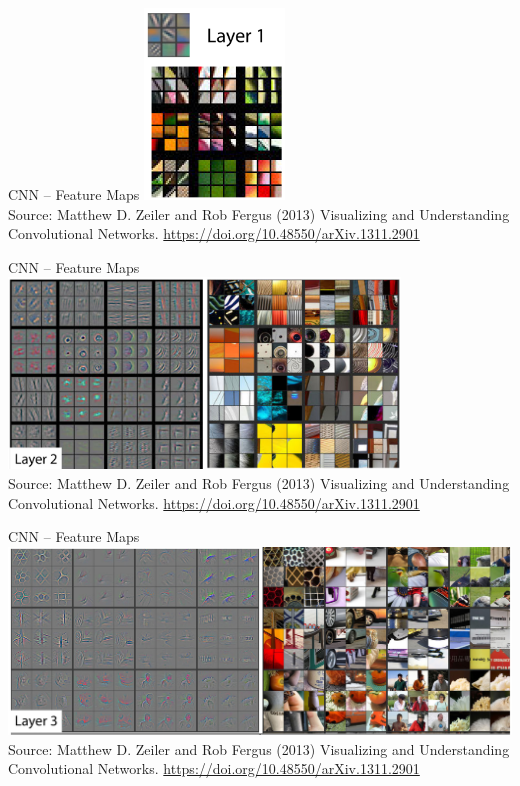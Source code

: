 \documentclass[ignorenonframetext,xcolor=x11names]{beamer}
\begin{document}
\begin{frame}{CNN -- Feature Maps}
\centering
\includegraphics[height=2in]{layer1.png} \\
\vspace{\baselineskip}
\scriptsize Source: Matthew D. Zeiler and Rob Fergus (2013) Visualizing and Understanding Convolutional Networks. \url{https://doi.org/10.48550/arXiv.1311.2901}
\end{frame}

\begin{frame}{CNN -- Feature Maps}
\centering
\includegraphics[height=2in]{layer2.png} \\
\vspace{\baselineskip}
\scriptsize Source: Matthew D. Zeiler and Rob Fergus (2013) Visualizing and Understanding Convolutional Networks. \url{https://doi.org/10.48550/arXiv.1311.2901}
\end{frame}

\begin{frame}{CNN -- Feature Maps}
\centering
\includegraphics[width=\textwidth]{layer3.png} \\
\vspace{\baselineskip}
\scriptsize Source: Matthew D. Zeiler and Rob Fergus (2013) Visualizing and Understanding Convolutional Networks. \url{https://doi.org/10.48550/arXiv.1311.2901}
\end{frame}
\end{document}
